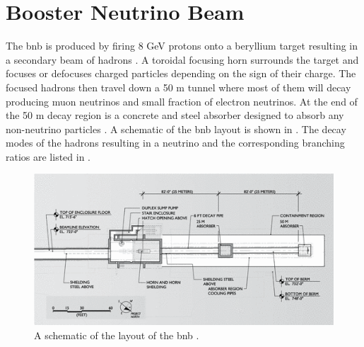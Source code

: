 \section{Booster Neutrino Beam}\label{sec:BNB}
The \gls{bnb} is produced by firing 8 GeV protons onto a beryllium target resulting in a secondary beam of hadrons \cite{FNAL_proton_accelerator}. A toroidal focusing horn surrounds the target and focuses or defocuses charged particles depending on the sign of their charge. The focused hadrons then travel down a 50 m tunnel where most of them will decay producing muon neutrinos and small fraction of electron neutrinos. At the end of the 50 m decay region is a concrete and steel absorber designed to absorb any non-neutrino particles \cite{SciBooNE_BNB_description}. A schematic of the \gls{bnb} layout is shown in . The decay modes of the hadrons resulting in a neutrino and the corresponding branching ratios are listed in . 

\begin{figure}
    \centering
    \includegraphics[width = \textwidth]{figures-chap3/BNB_schematic.png}
    \caption[Schematic of the BNB layout.]{A schematic of the layout of the \gls{bnb} \cite{BNB_flux}.}
    \label{fig: BNB schematic}
\end{figure}

